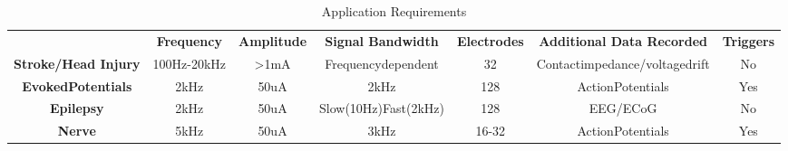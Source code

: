 \begin{table} 
    \begin{tabular}{ c c c c c c c }
         & \textbf{Frequency} & \textbf{Amplitude} & \textbf{Signal Bandwidth} & \textbf{Electrodes} & \textbf{Additional Data Recorded} & \textbf{Triggers} \\ 
        \textbf{Stroke/Head Injury} & 100Hz-20kHz & >1mA & Frequencydependent & 32 & Contactimpedance/voltagedrift & No \\ 
        \textbf{EvokedPotentials} & 2kHz & 50uA & 2kHz & 128 & ActionPotentials & Yes \\ 
        \textbf{Epilepsy} & 2kHz & 50uA & Slow(10Hz)Fast(2kHz) & 128 & EEG/ECoG & No \\ 
        \textbf{Nerve} & 5kHz & 50uA & 3kHz & 16-32 & ActionPotentials & Yes \\ 
    \end{tabular} 
    \caption{Application Requirements} 
\end{table}
